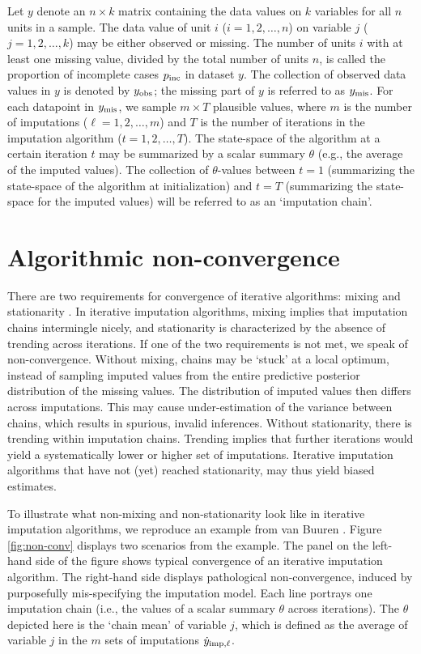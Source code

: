 \documentclass[Royal,times,sageh]{sagej}
\begin{document}
Let \(y\) denote an \(n \times k\) matrix containing the data values on \(k\) variables for all \(n\) units in a sample. The data value of unit \(i\) (\(i = 1, 2, \dots, n\)) on variable \(j\) (\(j = 1, 2, \dots, k\)) may be either observed or missing. The number of units \(i\) with at least one missing value, divided by the total number of units \(n\), is called the proportion of incomplete cases \(p_{\rm inc}\) in dataset \(y\). The collection of observed data values in \(y\) is denoted by \(y_{\rm obs}\); the missing part of \(y\) is referred to as \(y_{\rm mis}\). For each datapoint in \(y_{\rm mis}\), we sample \(m \times T\) plausible values, where \(m\) is the number of imputations (\(\ell = 1, 2, \dots, m\)) and \(T\) is the number of iterations in the imputation algorithm (\(t = 1, 2, \dots, T\)). The state-space of the algorithm at a certain iteration \(t\) may be summarized by a scalar summary \(\theta\) (e.g., the average of the imputed values). The collection of \(\theta\)-values between \(t=1\) (summarizing the state-space of the algorithm at initialization) and \(t=T\) (summarizing the state-space for the imputed values) will be referred to as an `imputation chain'.

\hypertarget{algorithmic-non-convergence}{%
\section{Algorithmic non-convergence}\label{algorithmic-non-convergence}}

There are two requirements for convergence of iterative algorithms: mixing and stationarity \citep{gelm13}. In iterative imputation algorithms, mixing implies that imputation chains intermingle nicely, and stationarity is characterized by the absence of trending across iterations. If one of the two requirements is not met, we speak of non-convergence. Without mixing, chains may be `stuck' at a local optimum, instead of sampling imputed values from the entire predictive posterior distribution of the missing values. The distribution of imputed values then differs across imputations. This may cause under-estimation of the variance between chains, which results in spurious, invalid inferences. Without stationarity, there is trending within imputation chains. Trending implies that further iterations would yield a systematically lower or higher set of imputations. Iterative imputation algorithms that have not (yet) reached stationarity, may thus yield biased estimates.

To illustrate what non-mixing and non-stationarity look like in iterative imputation algorithms, we reproduce an example from van Buuren \citeyearpar[\(\S\) 6.5.2]{buur18}. Figure \ref{fig:non-conv} displays two scenarios from the example. The panel on the left-hand side of the figure shows typical convergence of an iterative imputation algorithm. The right-hand side displays pathological non-convergence, induced by purposefully mis-specifying the imputation model. Each line portrays one imputation chain (i.e., the values of a scalar summary \(\theta\) across iterations). The \(\theta\) depicted here is the `chain mean' of variable \(j\), which is defined as the average of variable \(j\) in the \(m\) sets of imputations \(\dot y_{\rm imp, \ell}\).
\end{document}
